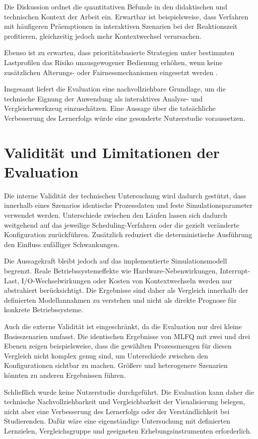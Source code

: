 Die Diskussion ordnet die quantitativen Befunde in den didaktischen und technischen Kontext der Arbeit ein. Erwartbar ist beispielsweise, dass Verfahren mit häufigeren Präemptionen in interaktiven Szenarien bei der Reaktionszeit profitieren, gleichzeitig jedoch mehr Kontextwechsel verursachen.

Ebenso ist zu erwarten, dass prioritätsbasierte Strategien unter bestimmten Lastprofilen das Risiko unausgewogener Bedienung erhöhen, wenn keine zusätzlichen Alterungs- oder Fairnessmechanismen eingesetzt werden \cite{tanenbaum2014modern,silberschatz2018operating}.

Insgesamt liefert die Evaluation eine nachvollziehbare Grundlage, um die technische Eignung der Anwendung als interaktives Analyse- und Vergleichswerkzeug einzuschätzen. Eine Aussage über die tatsächliche Verbesserung des Lernerfolgs würde eine gesonderte Nutzerstudie voraussetzen.

\section{Validität und Limitationen der Evaluation}

Die interne Validität der technischen Untersuchung wird dadurch gestützt, dass innerhalb eines Szenarios identische Prozessdaten und feste Simulationsparameter verwendet werden. Unterschiede zwischen den Läufen lassen sich dadurch weitgehend auf das jeweilige Scheduling-Verfahren oder die gezielt veränderte Konfiguration zurückführen. Zusätzlich reduziert die deterministische Ausführung den Einfluss zufälliger Schwankungen.

Die Aussagekraft bleibt jedoch auf das implementierte Simulationsmodell begrenzt. Reale Betriebssystemeffekte wie Hardware-Nebenwirkungen, Interrupt-Last, I/O-Wechselwirkungen oder Kosten von Kontextwechseln werden nur abstrahiert berücksichtigt. Die Ergebnisse sind daher als Vergleich innerhalb der definierten Modellannahmen zu verstehen und nicht als direkte Prognose für konkrete Betriebssysteme.

Auch die externe Validität ist eingeschränkt, da die Evaluation nur drei kleine Basisszenarien umfasst. Die identischen Ergebnisse von MLFQ mit zwei und drei Ebenen zeigen beispielsweise, dass die gewählten Prozessmengen für diesen Vergleich nicht komplex genug sind, um Unterschiede zwischen den Konfigurationen sichtbar zu machen. Größere und heterogenere Szenarien könnten zu anderen Ergebnissen führen.

Schließlich wurde keine Nutzerstudie durchgeführt. Die Evaluation kann daher die technische Nachvollziehbarkeit und Vergleichbarkeit der Visualisierung belegen, nicht aber eine Verbesserung des Lernerfolgs oder der Verständlichkeit bei Studierenden. Dafür wäre eine eigenständige Untersuchung mit definierten Lernzielen, Vergleichsgruppe und geeigneten Erhebungsinstrumenten erforderlich.
